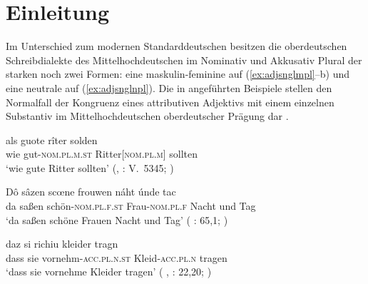 \chapter{Einleitung}
\label{ch:einleitung}

Im Unterschied zum modernen Standarddeutschen besitzen die
oberdeutschen Schreib\-dialekte des
Mittelhochdeutschen im Nominativ und Akkusativ Plural der
starken  noch zwei Formen: eine maskulin-feminine auf
 (\ref{ex:adjsnglmpl}--b) und eine neutrale auf
 (\ref{ex:adjsnglnpl}). Die in  angeführten
Beispiele stellen den Normalfall der Kongruenz eines attributiven
Adjektivs mit einem einzelnen Substantiv im
Mittelhochdeutschen oberdeutscher Prägung
dar \autocites[vgl.][181--184]{ksw2}[200--203]{paul2007}.

\begin{exe}
\ex \label{ex:adjsngl}
	\begin{xlist}
	\ex \label{ex:adjsnglmpl}
		\gll als guote rîter solden \\
			wie gut-\textsc{nom.pl.m.st} Ritter[\textsc{nom.pl.m}] sollten \\
	\trans `wie gute Ritter sollten'
		(, : V.~5345;
			\cite[606]{mertens2004}%
		)

	\ex \label{ex:adjsnglfpl}
		\gll Dô sâzen scœne frouwen náht únde tac \\
			da saßen schön-\textsc{nom.pl.f.st} Frau-\textsc{nom.pl.f} Nacht 
			und	Tag \\
	\trans `da saßen schöne Frauen Nacht und Tag'
		(%
			: 65,1;
			\cite[16]{deboor1988}%
		)

	\ex \label{ex:adjsnglnpl}
		\gll daz si richiu kleider tragn \\
			dass sie vornehm-\textsc{acc.pl.n.st} Kleid-\textsc{acc.pl.n}
			tragen \\
		\trans `dass sie vornehme Kleider tragen'
			(%
				, : 22,20;
				\cite[24]{knechtschirok2003}%
			)
\end{xlist}
\end{exe}

